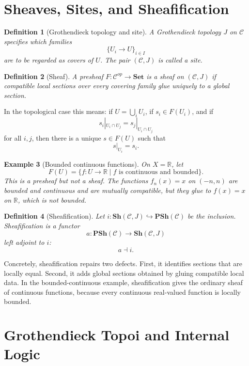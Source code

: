\documentclass[11pt]{article}
\newtheorem{definition}{Definition}[section]
\newtheorem{example}[definition]{Example}
\newcommand{\Set}{\mathbf{Set}}
\newcommand{\PSh}{\mathbf{PSh}}
\newcommand{\Sh}{\mathbf{Sh}}
\begin{document}
\section{Sheaves, Sites, and Sheafification}

\begin{definition}[Grothendieck topology and site]
A Grothendieck topology \(J\) on \(\mathcal C\) specifies which families
\[
\{U_i\to U\}_{i\in I}
\]
are to be regarded as covers of \(U\). The pair \((\mathcal C,J)\) is called a
site.
\end{definition}

\begin{definition}[Sheaf]
A presheaf \(F:\mathcal C^{op}\to\Set\) is a sheaf on \((\mathcal C,J)\) if
compatible local sections over every covering family glue uniquely to a global
section.
\end{definition}

In the topological case this means: if \(U=\bigcup_i U_i\), if
\(s_i\in F(U_i)\), and if
\[
s_i|_{U_i\cap U_j}=s_j|_{U_i\cap U_j}
\]
for all \(i,j\), then there is a unique \(s\in F(U)\) such that
\[
s|_{U_i}=s_i.
\]

\begin{example}[Bounded continuous functions]
On \(X=\mathbb R\), let
\[
F(U)=\{f:U\to\mathbb R\mid f\text{ is continuous and bounded}\}.
\]
This is a presheaf but not a sheaf. The functions \(f_n(x)=x\) on
\((-n,n)\) are bounded and continuous and are mutually compatible, but they
glue to \(f(x)=x\) on \(\mathbb R\), which is not bounded.
\end{example}

\begin{definition}[Sheafification]
Let \(i:\Sh(\mathcal C,J)\hookrightarrow \PSh(\mathcal C)\) be the inclusion.
Sheafification is a functor
\[
a:\PSh(\mathcal C)\to \Sh(\mathcal C,J)
\]
left adjoint to \(i\):
\[
a\dashv i.
\]
\end{definition}

Concretely, sheafification repairs two defects. First, it identifies sections
that are locally equal. Second, it adds global sections obtained by gluing
compatible local data. In the bounded-continuous example, sheafification gives
the ordinary sheaf of continuous functions, because every continuous real-valued
function is locally bounded.

\section{Grothendieck Topoi and Internal Logic}
\end{document}
